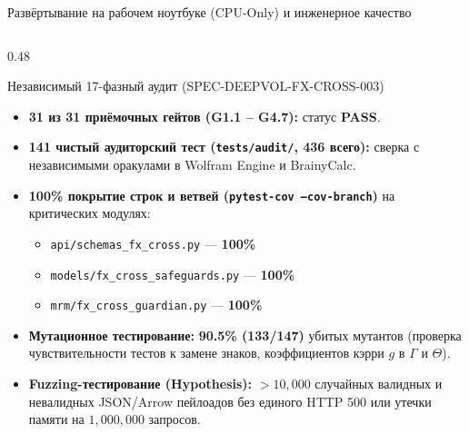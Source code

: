 \documentclass[aspectratio=169, 9pt]{beamer}
\begin{document}
\begin{frame}{Развёртывание на рабочем ноутбуке (CPU-Only) и инженерное качество}
\begin{columns}[T]
    \begin{column}{0.48\textwidth}
      \begin{exampleblock}{Независимый 17-фазный аудит (SPEC-DEEPVOL-FX-CROSS-003)}
        \begin{itemize}
          \item \textbf{31 из 31 приёмочных гейтов (G1.1 -- G4.7):} статус \textbf{PASS}.
          \item \textbf{141 чистый аудиторский тест (\texttt{tests/audit/}, 436 всего):} сверка с независимыми оракулами в Wolfram Engine и BrainyCalc.
          \item \textbf{100\% покрытие строк и ветвей (\texttt{pytest-cov --cov-branch})} на критических модулях:
            \begin{itemize}
              \item \texttt{api/schemas\_fx\_cross.py} --- \textbf{100\%}
              \item \texttt{models/fx\_cross\_safeguards.py} --- \textbf{100\%}
              \item \texttt{mrm/fx\_cross\_guardian.py} --- \textbf{100\%}
            \end{itemize}
          \item \textbf{Мутационное тестирование:} \textbf{90.5\% (133/147)} убитых мутантов (проверка чувствительности тестов к замене знаков, коэффициентов кэрри $g$ в $\Gamma$ и $\Theta$).
          \item \textbf{Fuzzing-тестирование (Hypothesis):} $> 10,000$ случайных валидных и невалидных JSON/Arrow пейлоадов без единого HTTP 500 или утечки памяти на $1,000,000$ запросов.
        \end{itemize}
      \end{exampleblock}
    \end{column}
  \end{columns}
\end{frame}
\end{document}
